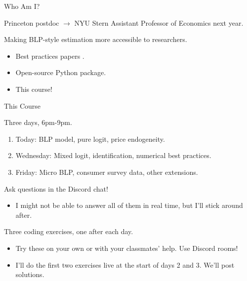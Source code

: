 \documentclass[aspectratio=169,t,11pt,table]{beamer}
\begin{document}

\begin{frame}{Who Am I?}
    \begin{wideitemize}
        \item Princeton postdoc $\to$ NYU Stern Assistant Professor of Economics next year.
        \pause
        \item Making BLP-style estimation more accessible to researchers.
        \begin{itemize}
            \item Best practices papers \citep{conlon2020best,conlon2025incorporating}.
            \item Open-source Python package.
            \item This course!
        \end{itemize}
    \end{wideitemize}
\end{frame}

\begin{frame}{This Course}
    \begin{wideitemize}
        \item Three days, 6pm-9pm.
        \begin{enumerate}
            \item Today: BLP model, pure logit, price endogeneity.
            \item Wednesday: Mixed logit, identification, numerical best practices.
            \item Friday: Micro BLP, consumer survey data, other extensions.
        \end{enumerate}
        \pause
        \item Ask questions in the Discord chat!
        \begin{itemize}
            \item I might not be able to answer all of them in real time, but I'll stick around after.
        \end{itemize}
        \pause
        \item Three coding exercises, one after each day.
        \begin{itemize}
            \item Try these on your own or with your classmates' help. Use Discord rooms!
            \item I'll do the first two exercises live at the start of days 2 and 3. We'll post solutions.
        \end{itemize}
    \end{wideitemize}
\end{frame}
\end{document}

